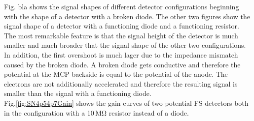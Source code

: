 	Fig. bla shows the signal shapes of different detector configurations beginning with the shape of a detector with a broken diode. The other two figures show the signal shape of a detector with a functioning diode and a functioning resistor. The most remarkable feature is that the signal height of the detector is much smaller and much broader that the signal shape of the other two configurations. In addition, the first overshoot is much lager due to the impedance mismatch caused by the broken diode. A broken diode gets conductive and therefore the potential at the MCP backside is equal to the potential of the anode. The electrons are not additionally accelerated and therefore the resulting signal is smaller than the signal with a functioning diode.\\
	Fig.\ref{fig:SN4p54p7Gain} shows the gain curves of two potential FS detectors both in the configuration with a 10\,\si{\mega\ohm} resistor instead of a diode. 
